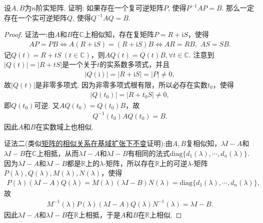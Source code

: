 \documentclass[../../main.tex]{subfiles}
\begin{document}
\begin{example}
设$A,B$为$n$阶实矩阵. 证明: 如果存在一个复可逆矩阵$P$, 使得$P^{-1}AP = B$. 那么一定存在一个实可逆矩阵$Q$, 使得$Q^{-1}AQ = B$.
\end{example}
\begin{proof}
{\color{blue}证法一:}由$A$和$B$在$\mathbb{C}$上相似知，存在复矩阵$P=R+\mathrm{i}S$，使得
\begin{align*}
AP=PB\Longleftrightarrow A(R+\mathrm{i}S)=(R+\mathrm{i}S)B\Longleftrightarrow AR=RB,\,\,AS=SB.
\end{align*}
记$Q(t)=R+tS\ (t\in\mathbb{C})$，则$AQ(t)=Q(t)B,\forall t\in\mathbb{C}$. 注意到$|Q(t)|=|R+tS|$是一个关于$t$的实系数多项式，并且
\begin{align*}
|Q(\mathrm{i})|=|R+\mathrm{i}S|=|P|\ne 0,
\end{align*}
故$|Q(t)|$是非零多项式. 因为非零多项式根有限，所以必存在实数$t_0$，使得
\begin{align*}
|Q(t_0)|=|R+t_0S|\ne 0,
\end{align*}
即$Q(t_0)$可逆. 又$AQ(t_0)=Q(t_0)B$，故
\begin{align*}
Q^{-1}(t_0)AQ(t_0)=B.
\end{align*}
因此$A$和$B$在实数域上也相似.

{\color{blue}证法二(类似\hyperref[corollary:矩阵的相似关系在基域扩张下不变]{矩阵的相似关系在基域扩张下不变}证明):}由$A,B$复相似知，$\lambda I-A$和$\lambda I-B$在$\mathbb{C}$上相抵，从而$\lambda I-A$和$\lambda I-B$有相同的法式$\mathrm{diag}\{d_1(\lambda),\cdots,d_n(\lambda)\}$. 因为$\lambda I-A$和$\lambda I-B$都是$\mathbb{R}$上的$\lambda$-矩阵，所以存在$\mathbb{R}$上的可逆$\lambda$-矩阵$P(\lambda),Q(\lambda),M(\lambda),N(\lambda)$，使得
\begin{align*}
P(\lambda)(\lambda I-A)Q(\lambda)=M(\lambda)(\lambda I-B)N(\lambda)=\mathrm{diag}\{d_1(\lambda),\cdots,d_n(\lambda)\},
\end{align*}
故
\begin{align*}
M^{-1}(\lambda)P(\lambda)(\lambda I-A)Q(\lambda)N^{-1}(\lambda)=\lambda I-B.
\end{align*}
因此$\lambda I-A$和$\lambda I-B$在$\mathbb{R}$上相抵，于是$A$和$B$在$\mathbb{R}$上相似.

\end{proof}
\end{document}
